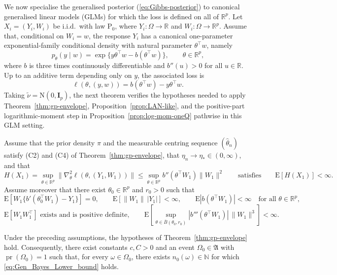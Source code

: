 \documentclass[11pt]{article}
\renewcommand{\Pr}{\operatorname{pr}}
\theoremstyle{plain}
\theoremstyle{definition}
\theoremstyle{remark}
\begin{document}
\label{sec:GLM}

We now specialise the generalised posterior (\ref{eq:Gibbs-posterior})
to canonical generalised linear models (GLMs) for which the loss is
defined on all of $\mathbb{R}^{p}$. Let $X_{i}=(Y_{i},W_{i})$ be
i.i.d.\ with law $\mathrm{P}_{0}$, where $Y_{i}:\Omega\to\mathbb{R}$
and $W_{i}:\Omega\to\mathbb{R}^{p}$. Assume that, conditional on
$W_{i}=w$, the response $Y_{i}$ has a canonical one-parameter exponential-family
conditional density with natural parameter $\theta^{\top}w$, namely
\[
p_{\theta}(y\mid w)=\exp\{y\theta^{\top}w-b(\theta^{\top}w)\},\qquad\theta\in\mathbb{R}^{p},
\]
where $b$ is three times continuously differentiable and $b''(u)>0$ for all $u\in\mathbb R$.
Up to an additive term depending only on $y$, the associated loss
is
\[
\ell(\theta,(y,w))=b(\theta^{\top}w)-y\theta^{\top}w.
\]
Taking $\tilde\nu=\mathrm{N}(0,\mathbf{I}_{p})$, the next theorem verifies
the hypotheses needed to apply Theorem~\ref{thm:gp-envelope}, Proposition~\ref{prop:LAN-like},
and the positive-part logarithmic-moment step in Proposition~\ref{prop:log-mom-oneQ}
pathwise in this GLM setting.

Assume that the prior density $\pi$ and the measurable centring sequence
$(\hat{\theta}_{n})$ satisfy {(C2)} and {(C4)} of Theorem~\ref{thm:gp-envelope},
that $\eta_{n}\to\eta_{*}\in(0,\infty)$, and that
\[
H(X_{1})=\sup_{\theta\in\mathbb{R}^{p}}\|\nabla_{\theta}^{2}\ell(\theta,(Y_{1},W_{1}))\|\le\sup_{\theta\in\mathbb{R}^{p}}b''(\theta^{\top}W_{1})\|W_{1}\|^{2}\qquad\text{satisfies}\qquad\mathrm{E}[H(X_{1})]<\infty.
\]
Assume moreover that there exist $\theta_{0}\in\mathbb{R}^{p}$ and
$r_{0}>0$ such that
\[
\mathrm{E}\!\left[W_{1}\{b'(\theta_{0}^{\top}W_{1})-Y_{1}\}\right]=0,\qquad\mathrm{E}[\|W_{1}\|\,|Y_{1}|]<\infty,\qquad\mathrm{E}|b(\theta^{\top}W_{1})|<\infty\quad\text{for all }\theta\in\mathbb{R}^{p},
\]
\[
\mathrm{E}[W_{1}W_{1}^{\top}]\text{ exists and is positive definite},\qquad\mathrm{E}\left[\sup_{\theta\in\overline{B}(\theta_{0},r_{0})}|b'''(\theta^{\top}W_{1})|\,\|W_{1}\|^{3}\right]<\infty.
\]
\begin{thm}
    \label{thm:GLM} Under the preceding assumptions, the
hypotheses of Theorem~\ref{thm:gp-envelope} hold. Consequently,
there exist constants $c,C>0$ and an event $\Omega_{0}\in\mathfrak{A}$
with $\Pr(\Omega_{0})=1$ such that, for every $\omega\in\Omega_{0}$,
there exists $n_{0}(\omega)\in\mathbb{N}$ for which \eqref{eq:Gen_Bayes_Lower_bound}
holds.
\end{thm}
\end{document}
